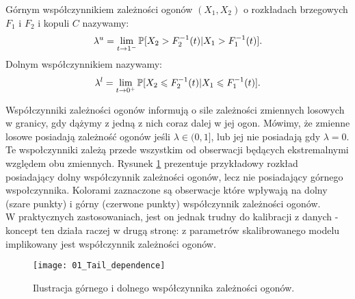\begin{df}
	Górnym współczynnikiem zależności ogonów $(X_1, X_2)$ o rozkładach brzegowych $F_1$ i $F_2$ i kopuli $C$ nazywamy:
	$$ \lambda^{u} = \lim\limits_{t\to1^{-}}\mathbb{P}[X_2 > F_2^{-1}(t) \vert X_1 > F_1^{-1}(t) ].$$
	Dolnym współczynnikiem nazywamy:
	$$ \lambda^{l} = \lim\limits_{t\to0^{+}}\mathbb{P}[X_2 \leqslant F_2^{-1}(t) \vert X_1 \leqslant F_1^{-1}(t) ].$$
\end{df}

Współczynniki zależności ogonów informują o sile zależności zmiennych losowych w granicy, gdy dążymy z jedną z nich coraz dalej w jej ogon. Mówimy, że zmienne losowe posiadają zależność ogonów jeśli $\lambda \in (0, 1]$, lub jej nie posiadają gdy $\lambda =0$. Te wspołczynniki zależą przede wszystkim od obserwacji będących ekstremalnymi względem obu zmiennych. Rysunek \ref{fig:tail_dependence} prezentuje przykładowy rozkład posiadający dolny współczynnik zależności ogonów, lecz nie posiadający górnego wspołczynnika. Kolorami zaznaczone są obserwacje które wpływają na dolny (szare punkty) i górny (czerwone punkty) współczynnik zależności ogonów.\\
W praktycznych zastosowaniach, jest on jednak trudny do kalibracji z danych - koncept ten działa raczej w drugą stronę: z parametrów skalibrowanego modelu implikowany jest współczynnik zależności ogonów.
\begin{figure}[H]
	\centering
	\texttt{[image: 01\_Tail\_dependence]}	
	\caption{Ilustracja górnego i dolnego współczynnika zależności ogonów.\label{fig:tail_dependence}}
\end{figure}